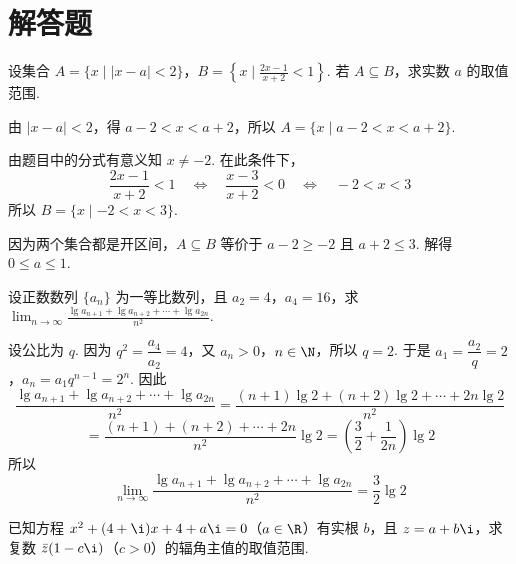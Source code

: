 \section{解答题}

\begin{problem}
设集合 \(A = \{x \mid |x - a| < 2\}\)，\(B = \left\{ x \mid \frac{2x - 1}{x + 2} < 1 \right\}\). 若 \(A \subseteq B\)，求实数 \(a\) 的取值范围.
\end{problem}

\begin{solution}
由 \(|x-a|<2\)，得 \(a-2<x<a+2\)，所以 \(A=\{x\mid a-2<x<a+2\}\).

由题目中的分式有意义知 \(x\ne-2\). 在此条件下，
\[
\frac{2x-1}{x+2}<1\quad\Longleftrightarrow\quad\frac{x-3}{x+2}<0\quad\Longleftrightarrow\quad -2<x<3
\]
所以 \(B=\{x\mid -2<x<3\}\).

因为两个集合都是开区间，\(A\subseteq B\) 等价于 \(a-2\ge-2\) 且 \(a+2\le3\). 解得 \(0\le a\le1\).
\end{solution}

\begin{problem}
设正数数列 \(\{a_n\}\) 为一等比数列，且 \(a_2 = 4\)，\(a_4 = 16\)，求 \(\displaystyle\lim_{n \to \infty} \frac{\lg a_{n + 1} + \lg a_{n + 2} + \cdots + \lg a_{2n}}{n^2}\).
\end{problem}

\begin{solution}
设公比为 \(q\). 因为 \(q^2=\dfrac{a_4}{a_2}=4\)，又 \(a_n>0\)，\(n\in\N\)，所以 \(q=2\). 于是 \(a_1=\dfrac{a_2}{q}=2\)，\(a_n=a_1q^{n-1}=2^n\).
因此
\[
\frac{\lg a_{n+1}+\lg a_{n+2}+\cdots+\lg a_{2n}}{n^2}
=\frac{(n+1)\lg2+(n+2)\lg2+\cdots+2n\lg2}{n^2}
\]
\[
=\frac{(n+1)+(n+2)+\cdots+2n}{n^2}\lg2
=\left(\frac32+\frac{1}{2n}\right)\lg2
\]
所以
\[
\lim_{n\to\infty}\frac{\lg a_{n+1}+\lg a_{n+2}+\cdots+\lg a_{2n}}{n^2}
=\frac32\lg2
\]
\end{solution}

\begin{problem}
已知方程 \(x^2 + (4 + \i)x + 4 + a\i = 0\)（\(a \in \R\)）有实根 \(b\)，且 \(z = a + b\i\)，求复数 \(\bar z(1 - c\i)\)（\(c > 0\)）的辐角主值的取值范围.
\end{problem}

